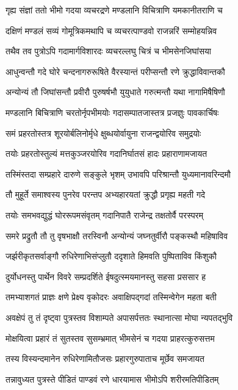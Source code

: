 \twolineshloka
{गृह्य संज्ञां ततो भीमो गदया व्यचरद्रणे}
{मण्डलानि विचित्राणि यमकानीतराणि च}


\twolineshloka
{दक्षिणं मण्डलं सव्यं गोमूत्रिकमथापि च}
{व्यचरत्पाण्डवो राजन्नरिं सम्मोहयन्निव}


\twolineshloka
{तथैव तव पुत्रोऽपि गदामार्गविशारदः}
{व्यचरल्लघु चित्रं च भीमसेनजिघांसया}


\twolineshloka
{आधुन्वन्तौ गदे घोरे चन्दनागरुरूषिते}
{वैरस्यान्तं परीप्सन्तौ रणे क्रुद्धाविवान्तकौ}


\twolineshloka
{अन्योन्यं तौ जिघांसन्तौ प्रवीरौ पुरुषर्षभौ}
{युयुधाते गरुत्मन्तौ यथा नागामिषैषिणौ}


\twolineshloka
{मण्डलानि बिचित्राणि चरतोर्नृपभीमयोः}
{गदासम्पातजास्तत्र प्रजज्ञुः पावकार्चिषः}


\twolineshloka
{समं प्रहरतोस्तत्र शूरयोर्बलिनोर्मृधे}
{क्षुब्धयोर्वायुना राजन्द्वयोरिव समुद्रयोः}


\twolineshloka
{तयोः प्रहरतोस्तुल्यं मत्तकुञ्जरयोरिव}
{गदानिर्घातसं हादः प्रहाराणामजायत}


\twolineshloka
{तस्मिंस्तदा सम्प्रहारे दारुणे सङ्कुले भृशम्}
{उभावपि परिश्रान्तौ युध्यमानावरिन्दमौ}


\twolineshloka
{तौ मुहूर्ते समाश्वस्य पुनरेव परन्तप}
{अभ्यहारयतां क्रुद्धौ प्रगृह्य महती गदे}


\twolineshloka
{तयोः समभवद्युद्धं घोररूपमसंवृतम्}
{गदानिपातै राजेन्द्र तक्षतोर्वै परस्परम्}


\twolineshloka
{समरे प्रद्रुतौ तौ तु वृषभाक्षौ तरस्विनौ}
{अन्योन्यं जघ्नतुर्वीरौ पङ्कस्थौ महिषाविव}


\twolineshloka
{जर्झरीकृतसर्वाङ्गौ रुधिरेणाभिसंप्लुतौ}
{ददृशाते हिमवति पुष्पिताविव किंशुकौ}


\twolineshloka
{दुर्योधनस्तु पार्थेन विवरे सम्प्रदर्शिते}
{ईषदुत्स्मयमानस्तु सहसा प्रससार ह}


\twolineshloka
{तमभ्याशगतं प्राज्ञः क्षणे प्रेक्ष्य वृकोदरः}
{अवाक्षिपद्गदां तस्मिन्वेगेन महता बती}


\twolineshloka
{अवक्षेपं तु तं दृष्ट्वा पुत्रस्तव विशाम्पते}
{अपासर्पत्ततः स्थानात्सा मोघा न्यपतद्भुवि}


\twolineshloka
{मोक्षयित्वा प्रहारं तं सुतस्तव सुसम्भ्रमात्}
{भीमसेनं च गदया प्राहरत्कुरुसत्तम}


\twolineshloka
{तस्य विस्यन्दमानेन रुधिरेणामितौजसः}
{प्रहारगुरुपाताच मूर्छेव समजायत}


\twolineshloka
{तन्नावुध्यत पुत्रस्ते पीडितं पाण्डवं रणे}
{धारयामास भीमोऽपि शरीरमतिपीडितम्}


